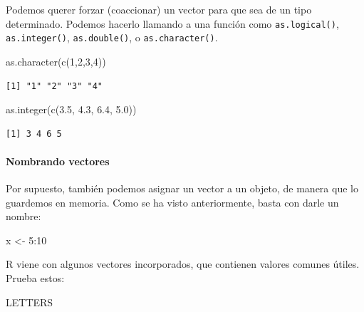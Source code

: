 \documentclass[
  letterpaper,
  DIV=11,
  numbers=noendperiod]{scrreprt}
\let\oldparagraph\paragraph
\renewcommand{\paragraph}[1]{\oldparagraph{#1}\mbox{}}
\newenvironment{Shaded}{\begin{snugshade}}{\end{snugshade}}
\newcommand{\DecValTok}[1]{\textcolor[rgb]{0.68,0.00,0.00}{#1}}
\newcommand{\FloatTok}[1]{\textcolor[rgb]{0.68,0.00,0.00}{#1}}
\newcommand{\FunctionTok}[1]{\textcolor[rgb]{0.28,0.35,0.67}{#1}}
\newcommand{\NormalTok}[1]{\textcolor[rgb]{0.00,0.23,0.31}{#1}}
\newcommand{\OtherTok}[1]{\textcolor[rgb]{0.00,0.23,0.31}{#1}}
\newcommand{\SpecialCharTok}[1]{\textcolor[rgb]{0.37,0.37,0.37}{#1}}
\begin{document}
Podemos querer forzar (coaccionar) un vector para que sea de un tipo
determinado. Podemos hacerlo llamando a una función como
\texttt{as.logical()}, \texttt{as.integer()}, \texttt{as.double()}, o
\texttt{as.character()}.

\begin{Shaded}
\begin{Highlighting}[]
\FunctionTok{as.character}\NormalTok{(}\FunctionTok{c}\NormalTok{(}\DecValTok{1}\NormalTok{,}\DecValTok{2}\NormalTok{,}\DecValTok{3}\NormalTok{,}\DecValTok{4}\NormalTok{))}
\end{Highlighting}
\end{Shaded}

\begin{verbatim}
[1] "1" "2" "3" "4"
\end{verbatim}

\begin{Shaded}
\begin{Highlighting}[]
\FunctionTok{as.integer}\NormalTok{(}\FunctionTok{c}\NormalTok{(}\FloatTok{3.5}\NormalTok{, }\FloatTok{4.3}\NormalTok{, }\FloatTok{6.4}\NormalTok{, }\FloatTok{5.0}\NormalTok{))}
\end{Highlighting}
\end{Shaded}

\begin{verbatim}
[1] 3 4 6 5
\end{verbatim}

\hypertarget{nombrando-vectores}{%
\paragraph{Nombrando vectores}\label{nombrando-vectores}}

Por supuesto, también podemos asignar un vector a un objeto, de manera
que lo guardemos en memoria. Como se ha visto anteriormente, basta con
darle un nombre:

\begin{Shaded}
\begin{Highlighting}[]
\NormalTok{x }\OtherTok{\textless{}{-}} \DecValTok{5}\SpecialCharTok{:}\DecValTok{10}
\end{Highlighting}
\end{Shaded}

R viene con algunos vectores incorporados, que contienen valores comunes
útiles. Prueba estos:

\begin{Shaded}
\begin{Highlighting}[]
\NormalTok{LETTERS}
\end{Highlighting}
\end{Shaded}
\end{document}
